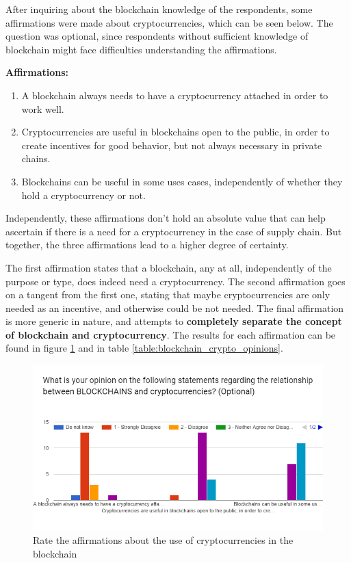 After inquiring about the blockchain knowledge of the respondents, some affirmations were made about cryptocurrencies, which can be seen below. The question was optional, since respondents without sufficient knowledge of blockchain might face difficulties understanding the affirmations.

\textbf{Affirmations: }
\begin{enumerate}
\item A blockchain always needs to have a cryptocurrency attached in order to work well.
\item Cryptocurrencies are useful in blockchains open to the public, in order to create incentives for good behavior, but not always necessary in private chains.
\item Blockchains can be useful in some uses cases, independently of whether they hold a cryptocurrency or not.
\end{enumerate}

Independently, these affirmations don't hold an absolute value that can help ascertain if there is a need for a cryptocurrency in the case of supply chain. But together, the three affirmations lead to a higher degree of certainty.

The first affirmation states that a blockchain, any at all, independently of the purpose or type, does indeed need a cryptocurrency. The second affirmation goes on a tangent from the first one, stating that maybe cryptocurrencies are only needed as an incentive, and otherwise could be not needed. The final affirmation is more generic in nature, and attempts to \textbf{completely separate the concept of blockchain and cryptocurrency}. The results for each affirmation can be found in figure \ref{fig:blockchain_crypto_opinions} and in table \ref{table:blockchain_crypto_opinions}.

\begin{figure}[h]
\centering
\includegraphics[scale=0.60]{media/blockchain_crypto_opinions.png}
\caption[Rate the affirmations about the use of cryptocurrencies in the blockchain]{Rate the affirmations about the use of cryptocurrencies in the blockchain}
\label{fig:blockchain_crypto_opinions}
\end{figure}





